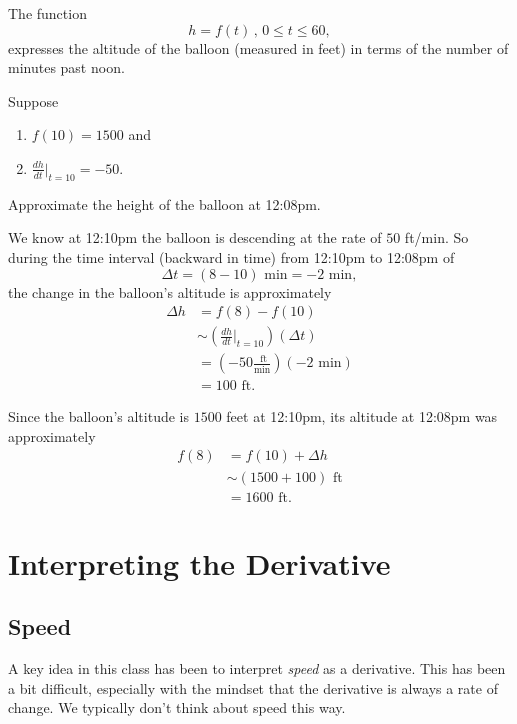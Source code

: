 \documentclass{ximera}
\begin{document}
\begin{example}
The function
\[
   h = f(t) \, , \, 0\leq t \leq 60,
\]
expresses the altitude of the balloon (measured in feet) in terms of the number of minutes past noon.

Suppose
\begin{enumerate}
\item $f(10)=1500$ and

\item $ \frac{dh}{dt}\Big|_{t=10} = -50$.
\end{enumerate}

Approximate the height of the balloon at 12:08pm.

\begin{explanation}
We know at 12:10pm the balloon is descending at the rate of $50$ ft/min. So during the time interval (backward in time) from 12:10pm to 12:08pm of
\[
 \Delta t = (8 - 10) \text{ min} = -2\text{ min},
\]
the change in the balloon's altitude is approximately
\begin{align*}
 \Delta h &= f(8)-f(10) \\
             &\sim \left( \frac{dh}{dt}\Big|_{t=10} \right) (\Delta t)    \\
             &= \left( -50 \frac{\text{ ft}}{\text{min}} \right)  (-2 \text{ min}) \\
              &= 100 \text{ ft} .
\end{align*}

Since the balloon's altitude is $1500$ feet at 12:10pm, its altitude at 12:08pm was approximately
\begin{align*}
     f(8) &= f(10) + \Delta h \\ 
           &\sim (1500 + 100) \text{ ft} \\
           &= 1600 \text{ ft}.
\end{align*}
\end{explanation}
\end{example}


\section{Interpreting the Derivative}

\subsection{Speed}

A key idea in this class has been to interpret \emph{speed} as a derivative. This has been a bit difficult, especially with the mindset that the derivative is always a rate of change. We typically don't think about speed this way.
\end{document}
